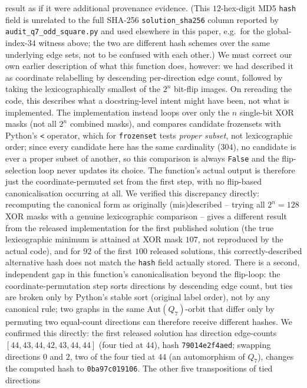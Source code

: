 \documentclass[12pt]{article}
\begin{document}
result as if it were additional provenance evidence. (This $12$-hex-digit MD5
\texttt{hash} field is unrelated to the full SHA-256
\texttt{solution\_sha256} column reported by
\texttt{audit\_q7\_odd\_square.py} and used elsewhere in this paper,
e.g.\ for the global-index-$34$ witness above; the two are different
hash schemes over the same underlying edge sets, not to be confused
with each other.) We must correct our own earlier
description of what this function does, however: we had described it
as coordinate relabelling by descending per-direction edge count,
followed by taking the lexicographically smallest of the $2^n$
bit-flip images. On rereading the code, this describes what a
docstring-level intent might have been, not what is implemented. The
implementation instead loops over only the $n$ single-bit XOR masks
(not all $2^n$ combined masks), and compares candidate frozensets with
Python's \texttt{<} operator, which for \texttt{frozenset} tests
\emph{proper subset}, not lexicographic order; since every candidate
here has the same cardinality ($304$), no candidate is ever a proper
subset of another, so this comparison is always \texttt{False} and the
flip-selection loop never updates its choice. The function's actual
output is therefore just the coordinate-permuted set from the first
step, with no flip-based canonicalisation occurring at all. We
verified this discrepancy directly: recomputing the canonical form as
originally (mis)described -- trying all $2^n=128$ XOR masks with a
genuine lexicographic comparison -- gives a different result from the
released implementation for the first published solution (the true
lexicographic minimum is attained at XOR mask $107$, not reproduced by
the actual code), and for $92$ of the first $100$ released solutions,
this correctly-described alternative hash does not match the
\texttt{hash} field actually stored. There is a second, independent
gap in this function's canonicalisation beyond the flip-loop: the
coordinate-permutation step sorts directions by descending edge count,
but ties are broken only by Python's stable sort (original label
order), not by any canonical rule; two graphs in the same
$\mathrm{Aut}(Q_7)$-orbit that differ only by permuting two
equal-count directions can therefore receive different hashes. We
confirmed this directly: the first released solution has direction
edge-counts $[44,43,44,42,43,44,44]$ (four tied at $44$), hash
\texttt{79014e2f4aed}; swapping directions $0$ and $2$, two of the four
tied at $44$ (an automorphism of $Q_7$), changes the computed hash to
\texttt{0ba97c019106}. The other five transpositions of tied directions
\end{document}
